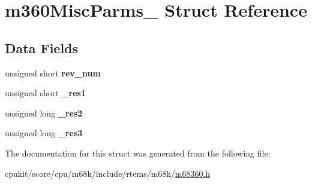 \hypertarget{structm360MiscParms__}{}\section{m360\+Misc\+Parms\+\_\+ Struct Reference}
\label{structm360MiscParms__}
\subsection*{Data Fields}
\begin{DoxyCompactItemize}
\item 
\mbox{\label{structm360MiscParms___ad293ad76000637375a7dd3553a7a8300}} 
unsigned short {\bfseries rev\+\_\+num}
\item 
\mbox{\label{structm360MiscParms___a96405f59b91a51b726134db3098b3ab3}} 
unsigned short {\bfseries \+\_\+res1}
\item 
\mbox{\label{structm360MiscParms___adfd89b435765b6c0e58ddff592000bcb}} 
unsigned long {\bfseries \+\_\+res2}
\item 
\mbox{\label{structm360MiscParms___ac126280e9380aac9a7fde8479ff32eb3}} 
unsigned long {\bfseries \+\_\+res3}
\end{DoxyCompactItemize}


The documentation for this struct was generated from the following file\+:\begin{DoxyCompactItemize}
\item 
cpukit/score/cpu/m68k/include/rtems/m68k/\mbox{\hyperlink{m68360_8h}{m68360.\+h}}\end{DoxyCompactItemize}
